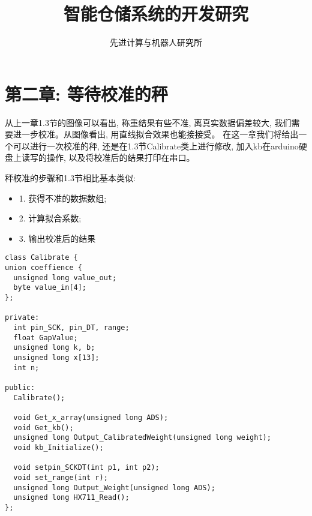 \documentclass{article}
\newcommand{\xiaosihao}{\fontsize{12pt}{\baselineskip}\selectfont}
\begin{document}
	
\newtheorem{example}{例}             %
\newtheorem{algorithm}{算法}
\newtheorem{theorem}{定理}[section]  %
\newtheorem{definition}{定义}
\newtheorem{axiom}{公理}
\newtheorem{property}{性质}
\newtheorem{proposition}{命题}
\newtheorem{lemma}{引理}
\newtheorem{corollary}{推论}
\newtheorem{remark}{注解}
\newtheorem{condition}{条件}
\newtheorem{conclusion}{结论}
\newtheorem{assumption}{假设}

\renewcommand{\contentsname}{目录}  %
\renewcommand{\abstractname}{摘要}  %
\renewcommand{\refname}{参考文献}   %
\renewcommand{\indexname}{索引}
\renewcommand{\figurename}{图}
\renewcommand{\tablename}{表}
\renewcommand{\appendixname}{附录}
\renewcommand{\algorithm}{算法}	

\title{智能仓储系统的开发研究}
\author{\xiaosihao 先进计算与机器人研究所}
		
\maketitle
		
\tableofcontents
\newpage

\section{第二章: 等待校准的秤}
从上一章1.3节的图像可以看出, 称重结果有些不准, 离真实数据偏差较大, 我们需要进一步校准。从图像看出, 用直线拟合效果也能接接受。
在这一章我们将给出一个可以进行一次校准的秤, 还是在1.3节Calibrate类上进行修改, 加入kb在arduino硬盘上读写的操作, 以及将校准后的结果打印在串口。

秤校准的步骤和1.3节相比基本类似:
\begin{itemize}
  \item 1. 获得不准的数据数组;
  \item 2. 计算拟合系数;
  \item 3. 输出校准后的结果
\end{itemize}

\begin{lstlisting}
class Calibrate {
union coeffience {
  unsigned long value_out;
  byte value_in[4];
};

private:
  int pin_SCK, pin_DT, range; 
  float GapValue;
  unsigned long k, b;
  unsigned long x[13];
  int n;

public:
  Calibrate();

  void Get_x_array(unsigned long ADS);
  void Get_kb();
  unsigned long Output_CalibratedWeight(unsigned long weight);
  void kb_Initialize();

  void setpin_SCKDT(int p1, int p2);
  void set_range(int r);
  unsigned long Output_Weight(unsigned long ADS);
  unsigned long HX711_Read();
};
\end{lstlisting}
\end{document}
